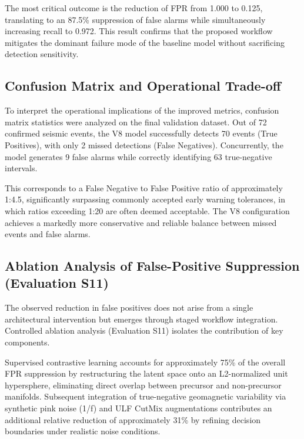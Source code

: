\documentclass[a4paper,fleqn]{cas-sc}
\begin{document}
The most critical outcome is the reduction of FPR from 1.000 to 0.125, translating to an 87.5\% suppression of false alarms while simultaneously increasing recall to 0.972. This result confirms that the proposed workflow mitigates the dominant failure mode of the baseline model without sacrificing detection sensitivity.

\subsection{Confusion Matrix and Operational Trade-off}

To interpret the operational implications of the improved metrics, confusion matrix statistics were analyzed on the final validation dataset. Out of 72 confirmed seismic events, the V8 model successfully detects 70 events (True Positives), with only 2 missed detections (False Negatives). Concurrently, the model generates 9 false alarms while correctly identifying 63 true-negative intervals.

This corresponds to a False Negative to False Positive ratio of approximately 1:4.5, significantly surpassing commonly accepted early warning tolerances, in which ratios exceeding 1:20 are often deemed acceptable. The V8 configuration achieves a markedly more conservative and reliable balance between missed events and false alarms.

\subsection{Ablation Analysis of False-Positive Suppression (Evaluation S11)}

The observed reduction in false positives does not arise from a single architectural intervention but emerges through staged workflow integration. Controlled ablation analysis (Evaluation S11) isolates the contribution of key components.

Supervised contrastive learning accounts for approximately 75\% of the overall FPR suppression by restructuring the latent space onto an L2-normalized unit hypersphere, eliminating direct overlap between precursor and non-precursor manifolds. Subsequent integration of true-negative geomagnetic variability via synthetic pink noise (1/f) and ULF CutMix augmentations contributes an additional relative reduction of approximately 31\% by refining decision boundaries under realistic noise conditions.
\end{document}
